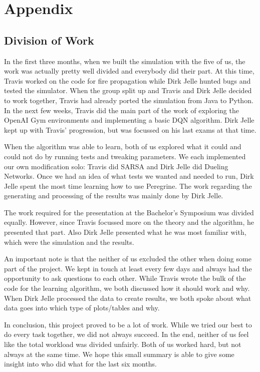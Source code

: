 
\clearpage
\section*{Appendix}
\subsection*{Division of Work}\label{sec:division}

In the first three months, when we built the simulation with the five of us, the work was actually pretty well divided and everybody did their part. At this time, Travis worked on the code for fire propagation while Dirk Jelle hunted bugs and tested the simulator. When the group split up and Travis and Dirk Jelle decided to work together, Travis had already ported the simulation from Java to Python. In the next few weeks, Travis did the main part of the work of exploring the OpenAI Gym environments and implementing a basic DQN algorithm. Dirk Jelle kept up with Travis' progression, but was focussed on his last exams at that time.

When the algorithm was able to learn, both of us explored what it could and could not do by running tests and tweaking parameters. We each implemented our own modification solo: Travis did SARSA and Dirk Jelle did Dueling Networks. Once we had an idea of what tests we wanted and needed to run, Dirk Jelle spent the most time learning how to use Peregrine. The work regarding the generating and processing of the results was mainly done by Dirk Jelle.

The work required for the presentation at the Bachelor's Symposium was divided equally. However, since Travis focussed more on the theory and the algorithm, he presented that part. Also Dirk Jelle presented what he was most familiar with, which were the simulation and the results.

An important note is that the neither of us excluded the other when doing some part of the project. We kept in touch at least every few days and always had the opportunity to ask questions to each other. While Travis wrote the bulk of the code for the learning algorithm, we both discussed how it should work and why. When Dirk Jelle processed the data to create results, we both spoke about what data goes into which type of plots/tables and why.

In conclusion, this project proved to be a lot of work. While we tried our best to do every task together, we did not always succeed. In the end, neither of us feel like the total workload was divided unfairly. Both of us worked hard, but not always at the same time. We hope this small summary is able to give some insight into who did what for the last six months.
